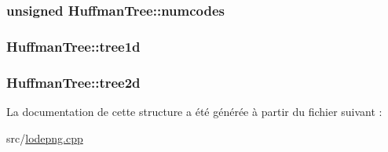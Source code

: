 \subsubsection[{numcodes}]{\setlength{\rightskip}{0pt plus 5cm}unsigned Huffman\+Tree\+::numcodes}\label{struct_huffman_tree_a608df5a24f60d1077a5cde19d5149e1f}
\hypertarget{struct_huffman_tree_a0bb5fd80eb9ec029f66cf30641b98363}{}
\subsubsection[{tree1d}]{ Huffman\+Tree\+::tree1d}\label{struct_huffman_tree_a0bb5fd80eb9ec029f66cf30641b98363}
\hypertarget{struct_huffman_tree_a24afa4a1079f6ee1c9829b9b5aa5fe89}{}
\subsubsection[{tree2d}]{ Huffman\+Tree\+::tree2d}\label{struct_huffman_tree_a24afa4a1079f6ee1c9829b9b5aa5fe89}


La documentation de cette structure a été générée à partir du fichier suivant \+:\begin{DoxyCompactItemize}
\item 
src/\hyperlink{lodepng_8cpp}{lodepng.\+cpp}\end{DoxyCompactItemize}
